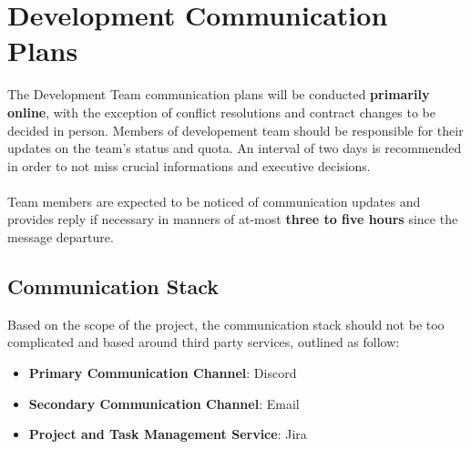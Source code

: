\chapter{Development Communication Plans}
The Development Team communication plans will be conducted \textbf{primarily online}, with the exception of conflict resolutions and contract changes to be decided in person.
Members of developement team should be responsible for their updates on the team's status and quota. An interval of two days is recommended in order to not miss crucial
informations and executive decisions.
\\\\
Team members are expected to be noticed of communication updates and provides reply if necessary in manners of at-most \textbf{three to five hours} since the message departure.

    \section{Communication Stack}
    Based on the scope of the project, the communication stack should not be too complicated and based around third party services, outlined as follow:
    \begin{itemize}
        \item \textbf{Primary Communication Channel}: Discord
        \item \textbf{Secondary Communication Channel}: Email
        \item \textbf{Project and Task Management Service}: Jira
    \end{itemize}

